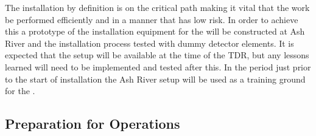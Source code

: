 The installation by definition is on the critical path making it vital
that the work be performed efficiently and in a manner that has low
risk. In order to achieve this a prototype of the installation
equipment for the   will be constructed at Ash
River and the installation process tested with dummy detector
elements. It is expected that the setup will be available at the time
of the TDR, but any lessons learned will need to be implemented and
tested after this. In the period just prior to the start of
installation the Ash River setup will be used as a training ground for
the .



%

\subsection{Preparation for Operations}

